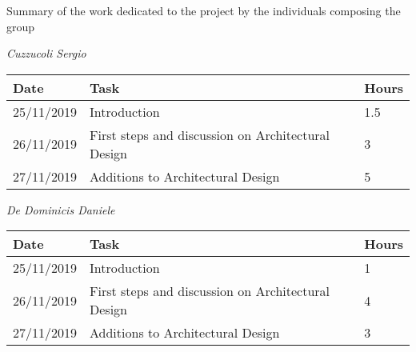 Summary of the work dedicated to the project by the individuals composing the group

\vspace{1cm}

\textit{Cuzzucoli Sergio}

\hfill

\begin{tabular}{|l|l|l|}

\hline

\textbf{Date} & \textbf{Task} & \textbf{Hours} \\ \hline
25/11/2019 & Introduction &  1.5 \\ \hline
26/11/2019 & First steps and discussion on Architectural Design & 3 \\ \hline
27/11/2019 & Additions to Architectural Design & 5 \\ \hline

\end{tabular}

\vspace{1cm}

\textit{De Dominicis Daniele}

\hfill

\begin{tabular}{|l|l|l|}

\hline

\textbf{Date} & \textbf{Task} & \textbf{Hours} \\ \hline
25/11/2019 & Introduction &  1 \\ \hline
26/11/2019 & First steps and discussion on Architectural Design & 4 \\ \hline
27/11/2019 & Additions to Architectural Design & 3 \\ \hline

\end{tabular}
